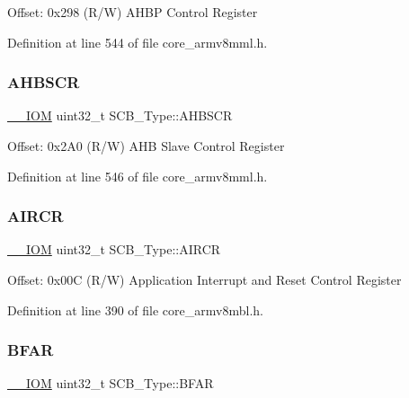 Offset\+: 0x298 (R/W) A\+H\+BP Control Register 

Definition at line 544 of file core\+\_\+armv8mml.\+h.

\mbox{\label{struct_s_c_b___type_a8c9d9eac30594dd061d34cfaacd5e4bb}} 
\subsubsection{\texorpdfstring{A\+H\+B\+S\+CR}{AHBSCR}}
{\footnotesize\ttfamily \hyperlink{core__sc300_8h_ab6caba5853a60a17e8e04499b52bf691}{\+\_\+\+\_\+\+I\+OM} uint32\+\_\+t S\+C\+B\+\_\+\+Type\+::\+A\+H\+B\+S\+CR}

Offset\+: 0x2\+A0 (R/W) A\+HB Slave Control Register 

Definition at line 546 of file core\+\_\+armv8mml.\+h.

\mbox{\label{struct_s_c_b___type_ad3e5b8934c647eb1b7383c1894f01380}} 
\subsubsection{\texorpdfstring{A\+I\+R\+CR}{AIRCR}}
{\footnotesize\ttfamily \hyperlink{core__sc300_8h_ab6caba5853a60a17e8e04499b52bf691}{\+\_\+\+\_\+\+I\+OM} uint32\+\_\+t S\+C\+B\+\_\+\+Type\+::\+A\+I\+R\+CR}

Offset\+: 0x00C (R/W) Application Interrupt and Reset Control Register 

Definition at line 390 of file core\+\_\+armv8mbl.\+h.

\mbox{\label{struct_s_c_b___type_a3f8e7e58be4e41c88dfa78f54589271c}} 
\subsubsection{\texorpdfstring{B\+F\+AR}{BFAR}}
{\footnotesize\ttfamily \hyperlink{core__sc300_8h_ab6caba5853a60a17e8e04499b52bf691}{\+\_\+\+\_\+\+I\+OM} uint32\+\_\+t S\+C\+B\+\_\+\+Type\+::\+B\+F\+AR}

